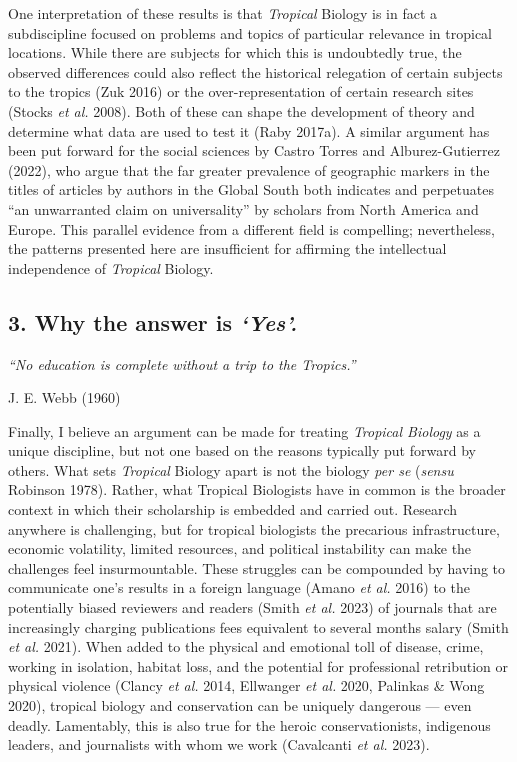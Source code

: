 \documentclass[
  12pt,
  man, donotrepeattitle,floatsintext]{apa6}
\begin{document}
One interpretation of these results is that \emph{Tropical} Biology is in fact a subdiscipline focused on problems and topics of particular relevance in tropical locations. While there are subjects for which this is undoubtedly true, the observed differences could also reflect the historical relegation of certain subjects to the tropics (Zuk 2016) or the over-representation of certain research sites (Stocks \emph{et al.} 2008). Both of these can shape the development of theory and determine what data are used to test it (Raby 2017a). A similar argument has been put forward for the social sciences by Castro Torres and Alburez-Gutierrez (2022), who argue that the far greater prevalence of geographic markers in the titles of articles by authors in the Global South both indicates and perpetuates ``an unwarranted claim on universality'' by scholars from North America and Europe. This parallel evidence from a different field is compelling; nevertheless, the patterns presented here are insufficient for affirming the intellectual independence of \emph{Tropical} Biology.

\hypertarget{why-the-answer-is-yes.}{%
\subsection{\texorpdfstring{3. Why the answer is \emph{`Yes'.}}{3. Why the answer is `Yes'.}}\label{why-the-answer-is-yes.}}

\noindent \emph{``No education is complete without a trip to the Tropics.''}

\hfill J. E. Webb (1960)

\bigskip

\noindent Finally, I believe an argument can be made for treating \emph{Tropical Biology} as a unique discipline, but not one based on the reasons typically put forward by others. What sets \emph{Tropical} Biology apart is not the biology \emph{per se} (\emph{sensu} Robinson 1978). Rather, what Tropical Biologists have in common is the broader context in which their scholarship is embedded and carried out. Research anywhere is challenging, but for tropical biologists the precarious infrastructure, economic volatility, limited resources, and political instability can make the challenges feel insurmountable. These struggles can be compounded by having to communicate one's results in a foreign language (Amano \emph{et al.} 2016) to the potentially biased reviewers and readers (Smith \emph{et al.} 2023) of journals that are increasingly charging publications fees equivalent to several months salary (Smith \emph{et al.} 2021). When added to the physical and emotional toll of disease, crime, working in isolation, habitat loss, and the potential for professional retribution or physical violence (Clancy \emph{et al.} 2014, Ellwanger \emph{et al.} 2020, Palinkas \& Wong 2020), tropical biology and conservation can be uniquely dangerous --- even deadly. Lamentably, this is also true for the heroic conservationists, indigenous leaders, and journalists with whom we work (Cavalcanti \emph{et al.} 2023).
\end{document}
